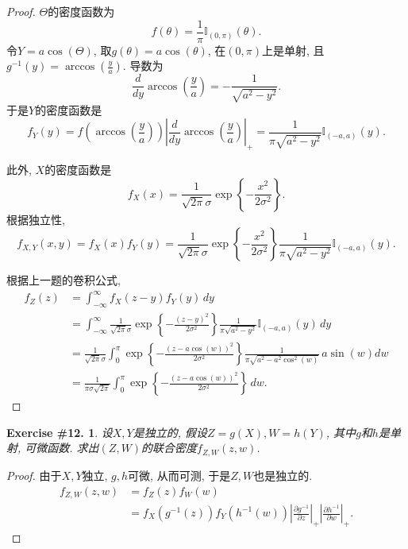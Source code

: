 \documentclass[UTF8, a4paper]{article}
\newtheorem{exercise}{Exercise \#12.}
\begin{document}
\begin{proof}
\(\Theta\)的密度函数为
$$
f(\theta) = \frac{1}{\pi}\mathbb{I}_{(0,\pi)}(\theta).
$$
令\(Y = a\cos(\Theta)\), 
取\(g(\theta) = a\cos(\theta)\), 在\((0, \pi)\)上是单射, 且\(g^{-1}(y) = \arccos\left(\frac{y}{a}\right)\).
导数为
$$
\frac{d}{dy}\arccos\left(\frac{y}{a}\right) = -\frac{1}{\sqrt{a^2 - y^2}}.
$$
于是\(Y\)的密度函数是
$$
f_Y(y) = f(\arccos\left(\frac{y}{a}\right))\left|\frac{d}{dy}\arccos\left(\frac{y}{a}\right)\right|_+ = \frac{1}{\pi \sqrt{a^2 - y^2}}\mathbb{I}_{(-a, a)}(y).
$$

此外, \(X\)的密度函数是
$$
f_X(x) = \frac{1}{\sqrt{2\pi}\sigma} \exp\left\{-\frac{x^2}{2\sigma^2}\right\}.
$$
根据独立性, 
$$
f_{X,Y}(x,y) = f_X(x)f_Y(y) = \frac{1}{\sqrt{2\pi}\sigma} \exp\left\{-\frac{x^2}{2\sigma^2}\right\} \frac{1}{\pi \sqrt{a^2 - y^2}}\mathbb{I}_{(-a, a)}(y).
$$

根据上一题的卷积公式, 
$$
\begin{aligned}
    f_Z(z) &= \int_{-\infty}^{\infty} f_X(z - y)f_Y(y) \,dy \\
    &= \int_{-\infty}^{\infty} \frac{1}{\sqrt{2\pi}\sigma} \exp\left\{-\frac{(z - y)^2}{2\sigma^2}\right\} \frac{1}{\pi \sqrt{a^2 - y^2}}\mathbb{I}_{(-a, a)}(y) \,dy \\
    &= \frac{1}{\sqrt{2\pi}\sigma} \int_{0}^{\pi} \exp\left\{-\frac{(z - a\cos(w))^2}{2\sigma^2}\right\} \frac{1}{\pi \sqrt{a^2 - a^2 \cos^2(w)}} \,a\sin(w) dw \\
    &= \frac{1}{\pi\sigma \sqrt{2\pi}} \int_{0}^{\pi} \exp\left\{-\frac{(z - a\cos(w))^2}{2\sigma^2}\right\} \,dw.
\end{aligned}
$$



\end{proof}


\begin{framed}
\begin{exercise}
设\(X,Y\)是独立的, 假设\(Z = g(X), W = h(Y)\), 其中\(g\)和\(h\)是单射, 可微函数. 求出\((Z,W)\)的联合密度\(f_{Z,W}(z,w)\).
\end{exercise}
\end{framed}

\begin{proof}
由于\(X,Y\)独立, \(g,h\)可微, 从而可测, 于是\(Z, W\)也是独立的.
$$
\begin{aligned}
    f_{Z,W}(z,w) &= f_Z(z) f_W(w) \\
    &= f_X(g^{-1}(z))f_Y(h^{-1}(w))\left|\frac{\partial g^{-1}}{\partial z}\right|_+\left|\frac{\partial h^{-1}}{\partial w}\right|_+.
\end{aligned}
$$
\end{proof}
\end{document}
